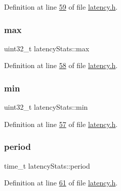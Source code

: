 Definition at line \hyperlink{latency_8h_source_l00059}{59} of file \hyperlink{latency_8h_source}{latency.\+h}.

\mbox{\label{structlatencyStats_aea39ad33215568e3c8b5b3b0439a1016}} 
\subsubsection{\texorpdfstring{max}{max}}
{\footnotesize\ttfamily uint32\+\_\+t latency\+Stats\+::max}



Definition at line \hyperlink{latency_8h_source_l00058}{58} of file \hyperlink{latency_8h_source}{latency.\+h}.

\mbox{\label{structlatencyStats_ade83359eab0f2113a088512023179e0d}} 
\subsubsection{\texorpdfstring{min}{min}}
{\footnotesize\ttfamily uint32\+\_\+t latency\+Stats\+::min}



Definition at line \hyperlink{latency_8h_source_l00057}{57} of file \hyperlink{latency_8h_source}{latency.\+h}.

\mbox{\label{structlatencyStats_aa5b82dd0fbe1379bb63d3fd7f601be9b}} 
\subsubsection{\texorpdfstring{period}{period}}
{\footnotesize\ttfamily time\+\_\+t latency\+Stats\+::period}



Definition at line \hyperlink{latency_8h_source_l00061}{61} of file \hyperlink{latency_8h_source}{latency.\+h}.

\mbox{\label{structlatencyStats_a0d590a2796ed6876cc0f4b19bc7d44df}} 
